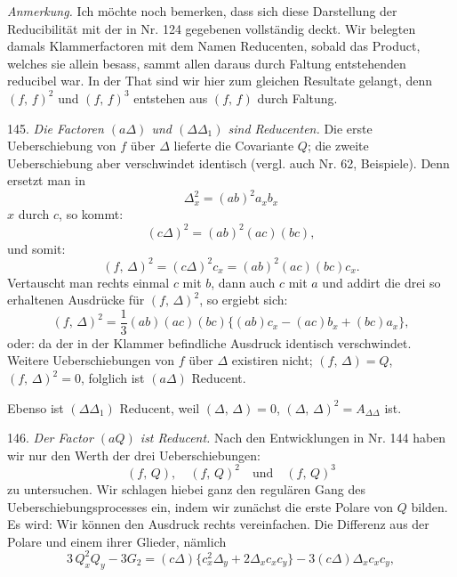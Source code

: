 \textit{Anmerkung.} Ich möchte noch bemerken, dass sich diese Darstellung der Reducibilität mit der in Nr. 124 gegebenen vollständig deckt. Wir belegten damals Klammerfactoren mit dem Namen Reducenten, sobald das Product, welches sie allein besass, sammt allen daraus durch Faltung entstehenden reducibel war. In der That sind wir hier zum gleichen Resultate gelangt, denn $(f,\,f)^2$ und $(f,\,f)^{3}$ entstehen aus $(f,\,f)$ durch Faltung.

145. \textit{Die Factoren $(a\Delta)$ und $(\Delta\Delta_1)$ sind Reducenten.} Die erste Ueberschiebung von $f$ über $\Delta$ lieferte die Covariante $Q$; die zweite Ueberschiebung aber verschwindet identisch (vergl. auch Nr. 62, Beispiele). Denn ersetzt man in
\[
\Delta_x^2 = (ab)^2 a_x b_x
\]
$x$ durch $c$, so kommt:
\[
(c\Delta)^2 = (ab)^2 (ac)(bc),
\]
und somit:
\[
(f,\,\Delta)^2 = (c\Delta)^2 c_x = (ab)^2 (ac)(bc) c_x.
\]
Vertauscht man rechts einmal $c$ mit $b$, dann auch $c$ mit $a$ und addirt die drei so erhaltenen Ausdrücke für $(f,\,\Delta)^2$, so ergiebt sich:
\[
(f,\,\Delta)^2 = \frac{1}{3}(ab)(ac)(bc)\{(ab)c_x - (ac)b_x + (bc)a_x\},
\]
oder:
da der in der Klammer befindliche Ausdruck identisch verschwindet. Weitere Ueberschiebungen von $f$ über $\Delta$ existiren nicht; $(f,\,\Delta) = Q$, $(f,\,\Delta)^2 = 0$, folglich ist $(a\Delta)$ Reducent.

Ebenso ist $(\Delta\Delta_1)$ Reducent, weil $(\Delta,\,\Delta) = 0$, $(\Delta,\,\Delta)^2 = A_{\Delta\Delta}$ ist.

146. \textit{Der Factor $(aQ)$ ist Reducent.} Nach den Entwicklungen in Nr. 144 haben wir nur den Werth der drei Ueberschiebungen:
\[
(f,\,Q), \quad (f,\,Q)^2 \quad \text{und} \quad (f,\,Q)^3
\]
zu untersuchen. Wir schlagen hiebei ganz den regulären Gang des Ueberschiebungsprocesses ein, indem wir zunächst die erste Polare von $Q$ bilden. Es wird:
Wir können den Ausdruck rechts vereinfachen. Die Differenz aus der Polare und einem ihrer Glieder, nämlich
\[
3\,Q_x^2 Q_y - 3G_2 = (c\Delta)\{c_x^2 \Delta_y + 2\Delta_x c_x c_y\} - 3(c\Delta)\Delta_x c_x c_y,
\]


